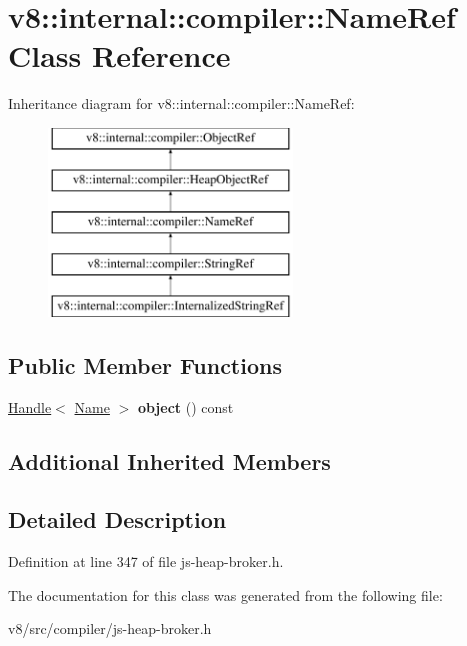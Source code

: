 \hypertarget{classv8_1_1internal_1_1compiler_1_1NameRef}{}\section{v8\+:\+:internal\+:\+:compiler\+:\+:Name\+Ref Class Reference}
\label{classv8_1_1internal_1_1compiler_1_1NameRef}
Inheritance diagram for v8\+:\+:internal\+:\+:compiler\+:\+:Name\+Ref\+:\begin{figure}[H]
\begin{center}
\leavevmode
\includegraphics[height=5.000000cm]{classv8_1_1internal_1_1compiler_1_1NameRef}
\end{center}
\end{figure}
\subsection*{Public Member Functions}
\begin{DoxyCompactItemize}
\item 
\mbox{\label{classv8_1_1internal_1_1compiler_1_1NameRef_a5be3ca5a8261af2e9055584bca317f15}} 
\mbox{\hyperlink{classv8_1_1internal_1_1Handle}{Handle}}$<$ \mbox{\hyperlink{classv8_1_1internal_1_1Name}{Name}} $>$ {\bfseries object} () const
\end{DoxyCompactItemize}
\subsection*{Additional Inherited Members}


\subsection{Detailed Description}


Definition at line 347 of file js-\/heap-\/broker.\+h.



The documentation for this class was generated from the following file\+:\begin{DoxyCompactItemize}
\item 
v8/src/compiler/js-\/heap-\/broker.\+h\end{DoxyCompactItemize}
